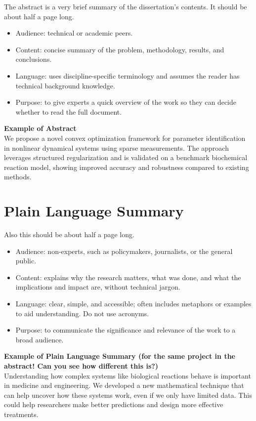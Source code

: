 
The abstract is a very brief summary of the dissertation's contents. It should be about half a page long. 

\begin{itemize}
\item Audience: technical or academic peers.
\item Content: concise summary of the problem, methodology, results, and conclusions.
\item Language: uses discipline-specific terminology and assumes the reader has technical background knowledge.
\item Purpose: to give experts a quick overview of the work so they can decide whether to read the full document.
\end{itemize}

\textbf{Example of Abstract}\\
We propose a novel convex optimization framework for parameter identification in nonlinear dynamical systems using sparse measurements. The approach leverages structured regularization and is validated on a benchmark biochemical reaction model, showing improved accuracy and robustness compared to existing methods.


\cleardoublepage{}
{}\mtcaddchapter 
\chapter*{Plain Language Summary}
\addtocounter{counter}{-1}


Also this should be about half a page long.

\begin{itemize}
\item Audience: non-experts, such as policymakers, journalists, or the general public.
\item Content: explains why the research matters, what was done, and what the implications and impact are, without technical jargon.
\item Language: clear, simple, and accessible; often includes metaphors or examples to aid understanding. Do not use acronyms.
\item Purpose: to communicate the significance and relevance of the work to a broad audience.
\end{itemize}


\textbf{Example of Plain Language Summary (for the same project in the abstract! Can you see how different this is?)}\\
Understanding how complex systems like biological reactions behave is important in medicine and engineering. We developed a new mathematical technique that can help uncover how these systems work, even if we only have limited data. This could help researchers make better predictions and design more effective treatments.



